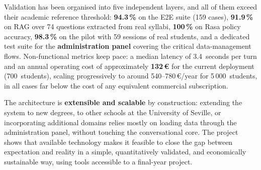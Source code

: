 Validation has been organised into five independent layers, and all of them exceed their academic reference threshold: \textbf{94.3\,\%} on the E2E suite (159 cases), \textbf{91.9\,\%} on RAG over 74 questions extracted from real syllabi, \textbf{100\,\%} on Rasa policy accuracy, \textbf{98.3\,\%} on the pilot with 59 sessions of real students, and a dedicated test suite for the \textbf{administration panel} covering the critical data-management flows. Non-functional metrics keep pace: a median latency of 3.4~seconds per turn and an annual operating cost of approximately \textbf{132\,€} for the current deployment (700~students), scaling progressively to around 540--780\,€/year for 5\,000~students, in all cases far below the cost of any equivalent commercial subscription.

The architecture is \textbf{extensible and scalable} by construction: extending the system to new degrees, to other schools at the University of Seville, or incorporating additional domains relies mostly on loading data through the administration panel, without touching the conversational core. The project shows that available technology makes it feasible to close the gap between expectation and reality in a simple, quantitatively validated, and economically sustainable way, using tools accessible to a final-year project.
